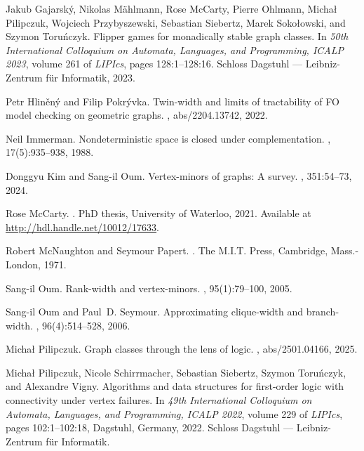\documentclass[11pt]{article}
\begin{document}
\begin{thebibliography}{10}
  Jakub Gajarsk{\'{y}}, Nikolas M{\"{a}}hlmann, Rose McCarty, Pierre Ohlmann, {\relax Mi}cha\l{} Pilipczuk, Wojciech Przybyszewski, Sebastian Siebertz, Marek Soko\l{}owski, and {\relax Sz}ymon Toru\'nczyk.
  \newblock Flipper games for monadically stable graph classes.
  \newblock In {\em 50th International Colloquium on Automata, Languages, and Programming, {ICALP} 2023}, volume 261 of {\em LIPIcs}, pages 128:1--128:16. Schloss Dagstuhl --- Leibniz-Zentrum f{\"{u}}r Informatik, 2023.
  
  Petr Hlin\v{e}n{\'{y}} and Filip Pokr{\'{y}}vka.
  \newblock Twin-width and limits of tractability of {FO} model checking on geometric graphs.
  , abs/2204.13742, 2022.
  
  Neil Immerman.
  \newblock Nondeterministic space is closed under complementation.
  , 17(5):935--938, 1988.
  
  Donggyu Kim and Sang{-}il Oum.
  \newblock Vertex-minors of graphs: {A} survey.
  , 351:54--73, 2024.
  
  Rose McCarty.
  .
  \newblock PhD thesis, University of Waterloo, 2021.
  \newblock Available at \href{http://hdl.handle.net/10012/17633}{http://hdl.handle.net/10012/17633}.
  
  Robert McNaughton and Seymour Papert.
  .
  \newblock The M.I.T. Press, Cambridge, Mass.-London, 1971.
  
  Sang-il Oum.
  \newblock Rank-width and vertex-minors.
  , 95(1):79--100, 2005.
  
  Sang{-}il Oum and Paul~D. Seymour.
  \newblock Approximating clique-width and branch-width.
  , 96(4):514--528, 2006.
  
  Micha\l{} Pilipczuk.
  \newblock Graph classes through the lens of logic.
  , abs/2501.04166, 2025.
  
  Micha{\l} Pilipczuk, Nicole Schirrmacher, Sebastian Siebertz, Szymon Toru\'{n}czyk, and Alexandre Vigny.
  \newblock Algorithms and data structures for first-order logic with connectivity under vertex failures.
  \newblock In {\em 49th International Colloquium on Automata, Languages, and Programming, ICALP 2022}, volume 229 of {\em LIPIcs}, pages 102:1--102:18, Dagstuhl, Germany, 2022. Schloss Dagstuhl --- Leibniz-Zentrum f{\"u}r Informatik.
  

\end{thebibliography}
\end{document}

